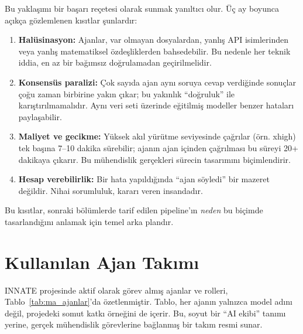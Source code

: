 Bu yaklaşımı bir başarı reçetesi olarak sunmak yanıltıcı olur. Üç ay
boyunca açıkça gözlemlenen kısıtlar şunlardır:

\begin{enumerate}
  \item \textbf{Halüsinasyon:} Ajanlar, var olmayan dosyalardan,
        yanlış API isimlerinden veya yanlış matematiksel
        özdeşliklerden bahsedebilir. Bu nedenle her teknik iddia, en
        az bir bağımsız doğrulamadan geçirilmelidir.
  \item \textbf{Konsensüs paralizi:} Çok sayıda ajan aynı soruya
        cevap verdiğinde sonuçlar çoğu zaman birbirine yakın çıkar;
        bu yakınlık ``doğruluk'' ile karıştırılmamalıdır. Aynı veri
        seti üzerinde eğitilmiş modeller benzer hataları paylaşabilir.
  \item \textbf{Maliyet ve gecikme:} Yüksek akıl yürütme seviyesinde
        çağrılar (örn. xhigh) tek başına 7--10 dakika sürebilir;
        ajanın ajan içinden çağrılması bu süreyi 20+ dakikaya çıkarır.
        Bu mühendislik gerçekleri sürecin tasarımını biçimlendirir.
  \item \textbf{Hesap verebilirlik:} Bir hata yapıldığında ``ajan
        söyledi'' bir mazeret değildir. Nihai sorumluluk, kararı
        veren insandadır.
\end{enumerate}

\noindent
Bu kısıtlar, sonraki bölümlerde tarif edilen pipeline'ın \emph{neden}
bu biçimde tasarlandığını anlamak için temel arka plandır.

\section{Kullanılan Ajan Takımı}
\label{sec:ma_takim}

INNATE projesinde aktif olarak görev almış ajanlar ve rolleri,
Tablo~\ref{tab:ma_ajanlar}'da özetlenmiştir. Tablo, her ajanın
yalnızca model adını değil, projedeki somut katkı örneğini de
içerir. Bu, soyut bir ``AI ekibi'' tanımı yerine, gerçek mühendislik
görevlerine bağlanmış bir takım resmi sunar.

